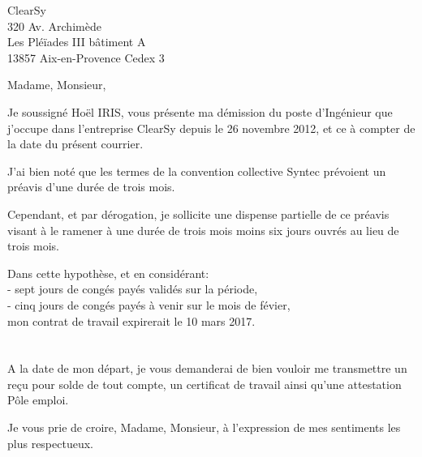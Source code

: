 \documentclass[11pt]{lettre}
\makeatletter
\newcommand*{\NoRule}{\renewcommand*{\rule@length}{0}}
\makeatother
\begin{document}
\begin{letter}{ClearSy\\320 Av. Archimède\\Les Pléïades III bâtiment A\\13857 Aix-en-Provence Cedex 3 }

  \def\concname{Objet :~}

  \date{le 2 décembre 2016}
  
  \signature{Hoel IRIS}
  \address{Hoel IRIS\\
  54 avenue Mathurin Moreau\\
  75019 Paris}
  \NoRule
  \notelephone
  \nofax
    \opening{Madame, Monsieur,\\}
    Je soussigné Hoël IRIS, vous présente ma démission du poste d'Ingénieur que j'occupe dans l'entreprise ClearSy depuis le 26 novembre 2012, et ce à compter de la date du présent courrier.

    J'ai bien noté que les termes de la convention collective Syntec prévoient un préavis d'une durée de trois mois. 
    
    Cependant, et par dérogation, je sollicite une dispense partielle de ce préavis visant à le ramener à une durée de trois mois moins six jours ouvrés au lieu de trois mois. 
    
    Dans cette hypothèse, et en considérant:\\
    - sept jours de congés payés validés sur la période,\\
    - cinq jours de congés payés à venir sur le mois de févier,\\
    mon contrat de travail expirerait le 10 mars 2017.
    \\\\\\
    A la date de mon départ, je vous demanderai de bien vouloir me transmettre un reçu pour solde de tout compte, un certificat de travail ainsi qu'une attestation Pôle emploi. 
    
    \closing{Je vous prie de croire, Madame, Monsieur, à l’expression de mes sentiments les plus respectueux.}
    
\end{letter}
 
\end{document}
